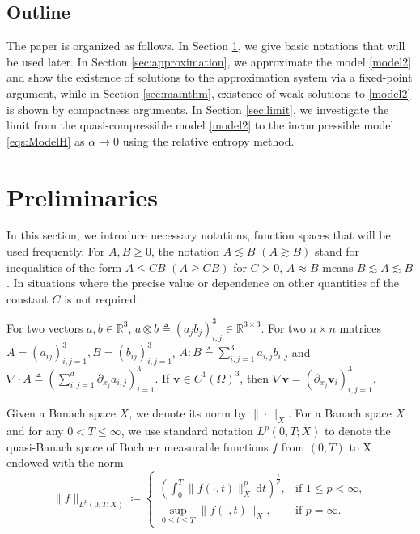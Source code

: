 \documentclass[reqno,a4paper,11pt]{amsart}
\theoremstyle{plain}
\numberwithin{equation}{section}
\renewcommand{\d}{\mathrm{d}}
\newcommand{\dt}{\d t}
\begin{document}
\subsection{Outline}
The paper is organized as follows. In Section \ref{sec:preliminaries}, we give basic notations that will be used later.
In Section \ref{sec:approximation}, we approximate the model \eqref{model2} and show the existence of solutions to the approximation system via a fixed-point argument, while
in Section \ref{sec:mainthm}, existence of weak solutions to \eqref{model2} is shown by compactness arguments.
In Section \ref{sec:limit}, we investigate the limit from the quasi-compressible model \eqref{model2} to the incompressible model \eqref{eqs:ModelH} as $\alpha\rightarrow 0$ using the relative entropy method.

\section{Preliminaries}
\label{sec:preliminaries}

In this section, we introduce necessary notations, function spaces that will be used frequently. 
For $A,B\geq 0$, the notation $A\lesssim B$ $(A \gtrsim B)$ stand for inequalities of the form $A \leq CB$ $(A \geq CB)$ for $C>0$,  $A\approx B$ means $B\lesssim A\lesssim B$.
In situations where the precise value or dependence on other quantities of the constant
$C$ is not required.



For two vectors  $a,b\in\mathbb{R}^{3}$,  $a\otimes b\triangleq(a_{j}b_{j})_{i,j}^{3}\in\mathbb{R}^{3\times 3}$. For two $n\times n$ matrices $A=(a_{ij})_{i,j=1}^3, B=(b_{ij})_{i,j=1}^3$,  $A:B\triangleq\sum_{i,j=1}^{3}a_{i,j}b_{i,j}$ and
$\nabla\cdot A\triangleq(\sum_{i,j=1}^{d}\partial_{x_{j}}a_{i,j})_{i=1}^{3}$.  If $\mathbf{v}\in C^{1}(\Omega)^{3}$, then $\nabla \mathbf{v}=(\partial_{x_{j}}\mathbf{v}_{i})_{i,j=1}^{3}$.

Given a Banach space $X$, we denote its norm by $\|\cdot\|_{X}$. For a Banach space $X$ and for any $0<T\leq\infty$, we use standard notation $L^{p}(0,T;X)$ to denote the quasi-Banach space of Bochner measurable functions $f$ from $(0,T)$ to X endowed with the norm
\begin{equation*}
	\|f\|_{L^{p}(0,T;X)}\coloneqq
	\begin{cases}
		(\int_0^T \|f(\cdot,t)\|^{p}_{X}\,\dt)^{\frac{1}{p}},&\text{if $1\leq p<\infty$},\\
		\sup_{0\leq t \leq T}\|f(\cdot,t)\|_X,&\text{if $p=\infty$}.
	\end{cases}
\end{equation*}
\end{document}
